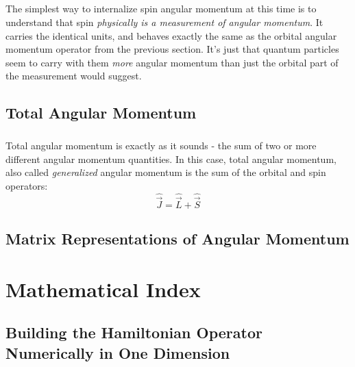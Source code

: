 \documentclass[12pt,letterpaper]{book}
\begin{document}
\paragraph*{}The simplest way to internalize spin angular momentum at this time is to understand that spin  \textit{physically is a measurement of angular momentum}. It carries the identical units, and behaves exactly the same as the orbital angular momentum operator from the previous section. It's just that quantum particles seem to carry with them \textit{more} angular momentum than just the orbital part of the measurement would suggest.



\section{Total Angular Momentum}

\paragraph*{}Total angular momentum is exactly as it sounds - the sum of two or more different angular momentum quantities. In this case, total angular momentum, also called \textit{generalized} angular momentum is the sum of the orbital and spin operators:
\begin{equation}
\label{generalAngMomtm}
\hat{\vec{J}} = \hat{\vec{L}} + \hat{\vec{S}}
\end{equation}


\section{Matrix Representations of Angular Momentum}






\chapter{Mathematical Index}



\section{Building the Hamiltonian Operator Numerically in One Dimension}
\end{document}
